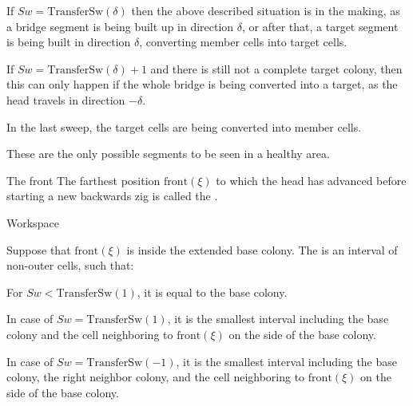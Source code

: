 \documentclass[12pt]{memoir}
\newcommand{\fld}[1]{\ensuremath{\textit{#1}}}
\newcommand{\pos}{\mathrm{pos}}
\newcommand{\Sweep}{\fld{Sw}}
\newcommand{\ZigDepth}{\fld{ZigDepth}}
\newcommand{\front}{\mathrm{front}}
\newcommand{\TransferSw}{\mathrm{TransferSw}}
\begin{document}
\begin{definition}
\begin{flushdescription}
\begin{bullets}
        \item If \( \Sweep = \TransferSw(\delta) \) then the above described situation is in the making, as
          a bridge segment is being built up in direction \( \delta \), or after that,
          a target segment is being built in direction \( \delta \), converting member cells into target cells.
          
        \item If \( \Sweep = \TransferSw(\delta) +1 \) and there is still not a complete target colony,
          then this can only happen if the whole bridge is being converted into a target, as the head travels
          in direction \( -\delta \).

         \item In the last sweep, the target cells are being converted into member cells.
        \end{bullets}
        These are the only possible segments to be seen in a healthy area.
        
    \item [The front] 
    The farthest position \( \front(\xi) \) to which the head has 
    advanced before starting a new backwards zig is called the .

     \item[Workspace]

       \begin{sloppypar}
          Suppose that \( \front(\xi) \) is inside the extended base colony.
          The  is an interval of non-outer cells, such that:         
       \end{sloppypar}

        \begin{bullets}
            \item For \( \Sweep < \TransferSw(1) \),
                  it is equal to the base colony.
            \item In case of \( \Sweep = \TransferSw(1) \),
                  it is the smallest interval including
                  the base colony and the cell neighboring to
                  \( \front(\xi) \) on the side of the base colony.

            \item In case of \( \Sweep = \TransferSw(-1) \),
                  it is the smallest interval including
                  the base colony, the right neighbor colony,
                  and the cell neighboring to
                  \( \front(\xi) \) on the side of the base colony.


\end{bullets}
\end{flushdescription}
\end{definition}
\end{document}
